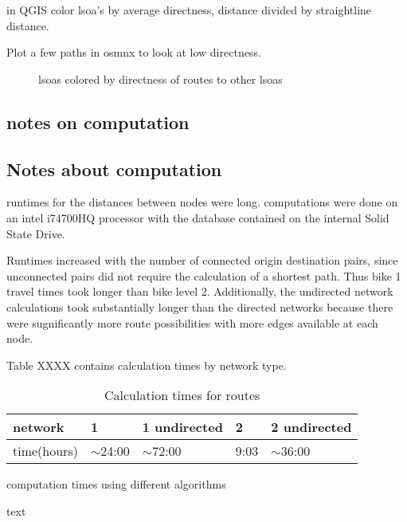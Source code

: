 in QGIS color lsoa's by  average directness, distance divided by straightline distance. 

Plot a few paths in osmnx to look at low directness. 


\begin{figure}
\centering
\caption{lsoas colored by directness of routes to other lsoas}
\label{fig:lsoa_directness}
\end{figure}

\subsection{notes on computation}


\subsection{Notes about computation}

runtimes for the distances between nodes were long. computations were done on an intel i74700HQ processor with the database contained on the internal Solid State Drive. 

Runtimes increased with the number of connected origin destination pairs, since unconnected pairs  did not require the calculation of a shortest path. Thus bike 1 travel times took longer than bike level 2. Additionally, the undirected network calculations took substantially longer than the directed networks because there were sugnificantly more route possibilities with more edges available at each node. 

Table XXXX contains calculation times by network type. 



\begin{table}[]
\centering
\begin{tabular}{@{}l|llll@{}}
network     & 1           & 1 undirected & 2    & 2 undirected \\ \hline
time(hours) & $\sim$24:00 & $\sim$72:00  & 9:03 & $\sim$36:00 
\end{tabular}
\caption{Calculation times for routes}
\label{table:net_calc_times}
\end{table}

\begin{table}
\centering
\caption{computation times using different algorithms}
\label{table:comp_times_algo}
\end{table}


text